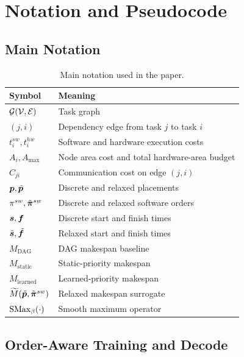\section{Notation and Pseudocode}

\subsection{Main Notation}
\begin{table}[h]
\centering
\caption{Main notation used in the paper.}
\label{tab:notation}
\small
\begin{tabular}{ll}
\toprule
Symbol & Meaning \\
\midrule
$\mathcal{G}(\mathcal{V},\mathcal{E})$ & Task graph \\
$(j,i)$ & Dependency edge from task $j$ to task $i$ \\
$t_i^{sw}, t_i^{hw}$ & Software and hardware execution costs \\
$A_i, A_{\max}$ & Node area cost and total hardware-area budget \\
$C_{ji}$ & Communication cost on edge $(j,i)$ \\
$\bm{p}, \tilde{\bm{p}}$ & Discrete and relaxed placements \\
$\pi^{sw}, \tilde{\bm{\pi}}^{sw}$ & Discrete and relaxed software orders \\
$\bm{s}, \bm{f}$ & Discrete start and finish times \\
$\tilde{\bm{s}}, \tilde{\bm{f}}$ & Relaxed start and finish times \\
$M_{\mathrm{DAG}}$ & DAG makespan baseline \\
$M_{\mathrm{static}}$ & Static-priority makespan \\
$M_{\mathrm{learned}}$ & Learned-priority makespan \\
$\widetilde{M}(\tilde{\bm{p}},\tilde{\bm{\pi}}^{sw})$ & Relaxed makespan surrogate \\
$\mathrm{SMax}_{\beta}(\cdot)$ & Smooth maximum operator \\
\bottomrule
\end{tabular}
\end{table}

\subsection{Order-Aware Training and Decode}
